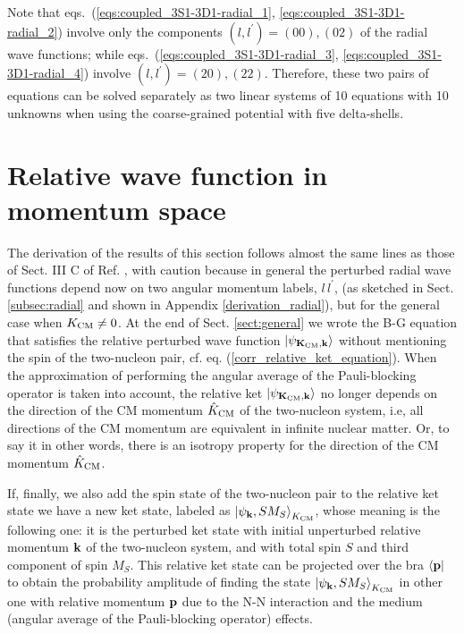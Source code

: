 \documentclass[aps,twocolumn,showpacs,preprintnumbers,amsmath,amssymb,nofootinbib,superscriptaddress,showkeys,noeprint]{revtex4-1}
\newcommand{\nk}{{\bf k}}
\newcommand{\np}{{\bf p}}
\newcommand{\nK}{{\bf K}}
\begin{document}
Note that eqs.~(\ref{eqs:coupled_3S1-3D1-radial_1},
\ref{eqs:coupled_3S1-3D1-radial_2}) involve only the components
$(l,l^\prime)=(00),(02)$ of the radial wave functions; while
eqs.~(\ref{eqs:coupled_3S1-3D1-radial_3},
\ref{eqs:coupled_3S1-3D1-radial_4}) involve $(l,l^\prime)=(20),(22)$.
Therefore, these two pairs of equations can be solved separately as
two linear systems of 10 equations with 10 unknowns when using the
coarse-grained potential with five delta-shells.



\section{Relative wave function in momentum space}
\label{Sec:mom_space}
The derivation of the results of this section follows almost the same
lines as those of Sect. III C of Ref. \cite{RuizSimo:2017tcb}, with
caution because in general the perturbed radial wave functions depend
now on two angular momentum labels, $l\,l^\prime$, (as sketched in
Sect.  \ref{subsec:radial} and shown in Appendix
\ref{derivation_radial}), but for the general case when $K_{\rm
  CM}\neq 0$. At the end of Sect. \ref{sect:general} we wrote the B-G
equation that satisfies the relative perturbed wave function $\left|
\psi_{\nK_{\rm CM},\nk} \right\rangle$ without mentioning the spin of
the two-nucleon pair, cf. eq. (\ref{corr_relative_ket_equation}).
When the approximation of performing the angular average of the
Pauli-blocking operator is taken into account, the relative ket
$\left| \psi_{\nK_{\rm CM},\nk} \right\rangle$ no longer depends on
the direction of the CM momentum $\hat{K}_{\rm CM}$ of the two-nucleon
system, i.e, all directions of the CM momentum are equivalent in
infinite nuclear matter. Or, to say it in other words, there is an
isotropy property for the direction of the CM momentum $\hat{K}_{\rm
  CM}$.

If, finally, we also add the spin state of the two-nucleon pair to the
relative ket state we have a new ket state, labeled as $\left|
\psi_{\nk}, S M_S \right\rangle_{K_{\rm CM}}$, whose meaning is the
following one: it is the perturbed ket state with initial unperturbed
relative momentum $\nk$ of the two-nucleon system, and with total spin
$S$ and third component of spin $M_S$. This relative ket state can be
projected over the bra $\left\langle \np \right|$ to obtain the
probability amplitude of finding the state $\left| \psi_{\nk}, S M_S
\right\rangle_{K_{\rm CM}}$ in other one with relative momentum $\np$
due to the N-N interaction and the medium (angular average of the
Pauli-blocking operator) effects.
\end{document}
